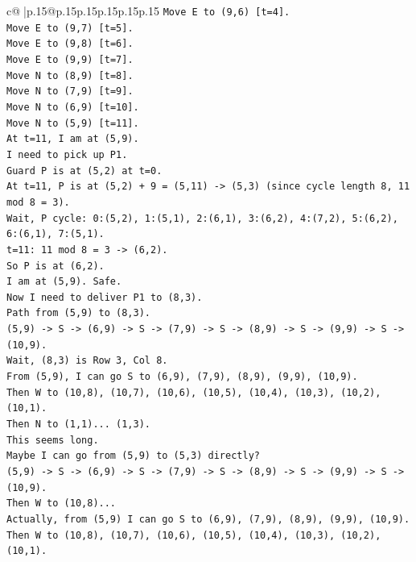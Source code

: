 \documentclass{article}
\begin{document}
{\begin{supertabular}{c@{$\;$}|p{.15\linewidth}@{}p{.15\linewidth}p{.15\linewidth}p{.15\linewidth}p{.15\linewidth}p{.15\linewidth}}
{{{\texttt{Move E to (9,6) {[}t=4{]}.} \\
\texttt{Move E to (9,7) {[}t=5{]}.} \\
\texttt{Move E to (9,8) {[}t=6{]}.} \\
\texttt{Move E to (9,9) {[}t=7{]}.} \\
\texttt{Move N to (8,9) {[}t=8{]}.} \\
\texttt{Move N to (7,9) {[}t=9{]}.} \\
\texttt{Move N to (6,9) {[}t=10{]}.} \\
\texttt{Move N to (5,9) {[}t=11{]}.} \\
\texttt{At t=11, I am at (5,9).} \\
\texttt{I need to pick up P1.} \\
\texttt{Guard P is at (5,2) at t=0.} \\
\texttt{At t=11, P is at (5,2) + 9 = (5,11) {-}> (5,3) (since cycle length 8, 11 mod 8 = 3).} \\
\texttt{Wait, P cycle: 0:(5,2), 1:(5,1), 2:(6,1), 3:(6,2), 4:(7,2), 5:(6,2), 6:(6,1), 7:(5,1).} \\
\texttt{t=11: 11 mod 8 = 3 {-}> (6,2).} \\
\texttt{So P is at (6,2).} \\
\texttt{I am at (5,9). Safe.} \\
\texttt{Now I need to deliver P1 to (8,3).} \\
\texttt{Path from (5,9) to (8,3).} \\
\texttt{(5,9) {-}> S {-}> (6,9) {-}> S {-}> (7,9) {-}> S {-}> (8,9) {-}> S {-}> (9,9) {-}> S {-}> (10,9).} \\
\texttt{Wait, (8,3) is Row 3, Col 8.} \\
\texttt{From (5,9), I can go S to (6,9), (7,9), (8,9), (9,9), (10,9).} \\
\texttt{Then W to (10,8), (10,7), (10,6), (10,5), (10,4), (10,3), (10,2), (10,1).} \\
\texttt{Then N to (1,1)... (1,3).} \\
\texttt{This seems long.} \\
\texttt{Maybe I can go from (5,9) to (5,3) directly?} \\
\texttt{(5,9) {-}> S {-}> (6,9) {-}> S {-}> (7,9) {-}> S {-}> (8,9) {-}> S {-}> (9,9) {-}> S {-}> (10,9).} \\
\texttt{Then W to (10,8)...} \\
\texttt{Actually, from (5,9) I can go S to (6,9), (7,9), (8,9), (9,9), (10,9).} \\
\texttt{Then W to (10,8), (10,7), (10,6), (10,5), (10,4), (10,3), (10,2), (10,1).} \\
}}}
\end{supertabular}}
\end{document}

